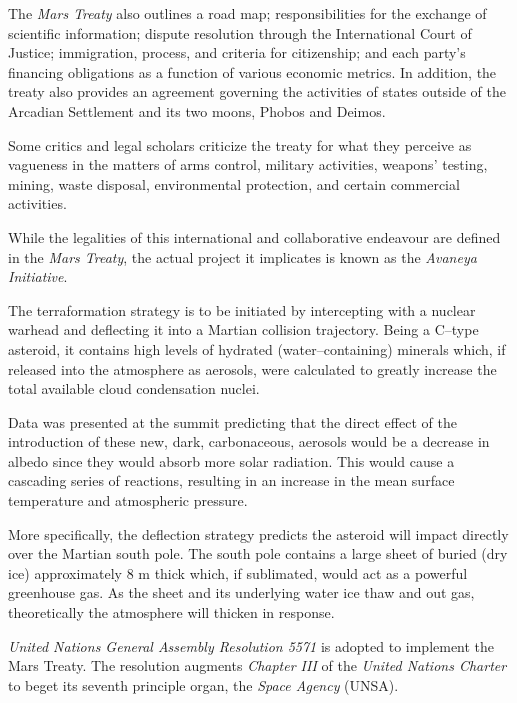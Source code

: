 The {\it Mars Treaty} also outlines a road map; responsibilities for the exchange of scientific information; dispute resolution through the International Court of Justice; immigration, process, and criteria for citizenship; and each party's financing obligations as a function of various economic metrics. In addition, the treaty also provides an agreement governing the activities of states outside of the Arcadian Settlement and its two moons, Phobos and Deimos. 

Some critics and legal scholars criticize the treaty for what they perceive as vagueness in the matters of arms control, military activities, weapons' testing, mining, waste disposal, environmental protection, and certain commercial activities.

While the legalities of this international and collaborative endeavour are defined in the {\it Mars Treaty}, the actual project it implicates is known as the {\it Avaneya Initiative}.

The terraformation strategy is to be initiated by intercepting  with a nuclear warhead and deflecting it into a Martian collision trajectory. Being a C--type asteroid, it contains high levels of hydrated (water--containing) minerals which, if released into the atmosphere as aerosols, were calculated to greatly increase the total available cloud condensation nuclei.

Data was presented at the summit predicting that the direct effect of the introduction of these new, dark, carbonaceous, aerosols would be a decrease in albedo since they would absorb more solar radiation. This would cause a cascading series of reactions, resulting in an increase in the mean surface temperature and atmospheric pressure.

More specifically, the deflection strategy predicts the asteroid will impact directly over the Martian south pole. The south pole contains a large sheet of buried  (dry ice) approximately 8 m thick which, if sublimated, would act as a powerful greenhouse gas. As the sheet and its underlying water ice thaw and out gas, theoretically the atmosphere will thicken in response.
\StopTimelineDate

{\it United Nations General Assembly Resolution 5571} is adopted to implement the Mars Treaty. The resolution augments {\it Chapter III} of the {\it United Nations Charter} to beget its seventh principle organ, the {\it Space Agency} (UNSA).

